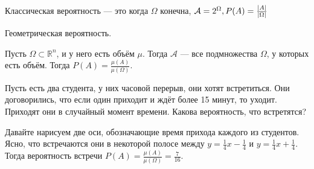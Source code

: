 \begin{example}
  Классическая вероятность --- это когда $\Omega$ конечна, $\mathcal{A} = 2^{\Omega}, P(A) = \frac{\left\lvert A \right\rvert}{\left\lvert \Omega \right\rvert}$
\end{example}

\begin{example}
  Геометрическая вероятность.

  Пусть $\Omega \subset \mathbb{R} ^n$, и у него есть объём $\mu$. Тогда $\mathcal{A} $ --- все подмножества $\Omega$, у которых есть объём.
  Тогда $P(A) = \frac{\mu(A)}{\mu(\Omega)}$.
\end{example}

\begin{example}
  Пусть есть два студента, у них часовой перерыв, они хотят встретиться. Они договорились, что если один приходит и ждёт более 15 минут, то уходит.
  Приходят они в случайный момент времени. Какова вероятность, что встретятся?

  Давайте нарисуем две оси, обозначающие время прихода каждого из студентов. Ясно, что встречаются они в некоторой полосе между $y = \frac{1}{4}x - \frac14$
  и $y = \frac14 x + \frac{1}{4}$. Тогда вероятность встречи $P(A) = \frac{\mu(A)}{\mu(\Omega)} = \frac{7}{16}$.
\end{example}



